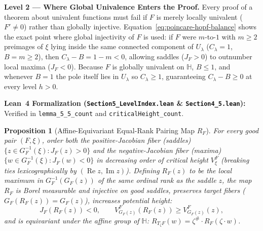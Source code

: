 \documentclass[12pt]{article}
\def\H{\mathbb{H}}
\newtheorem{prop}[thm]{Proposition}
\theoremstyle{definition}
\numberwithin{equation}{section}
\begin{document}
\begin{leveltwo}
\noindent\textbf{\textcolor{l2border}{Level 2 --- Where Global Univalence Enters the Proof.}}
Every proof of a theorem about univalent functions must fail if $F$ is merely locally univalent ($F' \ne 0$) rather than globally injective. Equation~\eqref{eq:poincare-hopf-balance} shows the exact point where global injectivity of $F$ is used: if $F$ were $m$-to-$1$ with $m \ge 2$ preimages of $\xi$ lying inside the same connected component of $U_\lambda$ ($C_\lambda = 1$, $B = m \ge 2$), then $C_\lambda - B = 1 - m < 0$, allowing saddles ($J_F > 0$) to outnumber local maxima ($J_F < 0$). Because $F$ is globally univalent on $\H$, $B \le 1$, and whenever $B = 1$ the pole itself lies in $U_\lambda$ so $C_\lambda \ge 1$, guaranteeing $C_\lambda - B \ge 0$ at every level $h > 0$.

\smallskip
\noindent\textbf{\textcolor{leannote}{Lean~4 Formalization (\texttt{Section5\_LevelIndex.lean} \& \texttt{Section4\_5.lean}):}} Verified in \texttt{lemma\_5\_5\_count} and \texttt{criticalHeight\_count}.
\end{leveltwo}

\begin{prop}[Affine-Equivariant Equal-Rank Pairing Map $R_F$]\label{prop:RF-pairing}
For every good pair $(F, \xi)$, order both the positive-Jacobian fiber (saddles) $\{z \in G_F^{-1}(\xi) : J_F(z) > 0\}$ and the negative-Jacobian fiber (maxima) $\{w \in G_F^{-1}(\xi) : J_F(w) < 0\}$ in decreasing order of critical height $V_\xi^F$ (breaking ties lexicographically by $(\operatorname{Re} z, \operatorname{Im} z)$). Defining $R_F(z)$ to be the local maximum in $G_F^{-1}(G_F(z))$ of the same ordinal rank as the saddle $z$, the map $R_F$ is Borel measurable and injective on good saddles, preserves target fibers ($G_F(R_F(z)) = G_F(z)$), increases potential height:
\begin{equation}\label{eq:RF-height-increase}
  J_F(R_F(z)) < 0, \qquad V_{G_F(z)}^F(R_F(z)) \ge V_{G_F(z)}^F(z),
\end{equation}
and is equivariant under the affine group of $\H$: $R_{T_\zeta F}(w) = \zeta^\# \cdot R_F(\zeta \cdot w)$.
\end{prop}
\end{document}
